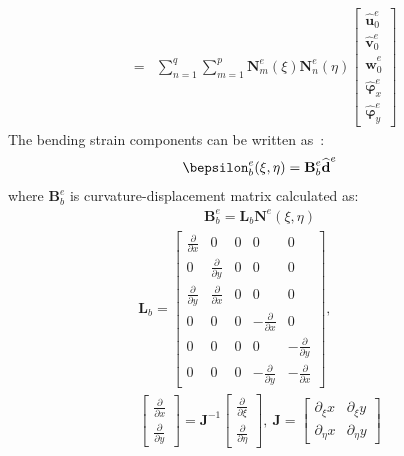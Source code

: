 \documentclass[a4paper,12pt]{article}
\begin{document}
{\begin{eqnarray}
& = & \sum_{n=1}^q\sum_{m=1}^p\textbf{N}_m^e(\xi)\textbf{N}_n^e(\eta)
\left [ \begin{array}{c}
\widehat{\textbf{u}}_0^e \\
\widehat{\textbf{v}}_0^e \\
\widehat{\textbf{w}}_0^e \\
\widehat{\boldsymbol{\varphi}}_x^e \\
\widehat{\boldsymbol{\varphi}}_y^e
\end{array} \right]
\end{eqnarray}
The bending strain components can be written as~\cite{ferreira2008matlab}:
\begin{eqnarray}
\bepsilon_b^e(\xi,\eta)=\textbf{B}_b^e\widehat{\textbf{d}}^e
\end{eqnarray}
where \(\textbf{B}_b^e\) is curvature-displacement matrix calculated as:
\begin{eqnarray}
\textbf{B}_b^e=\textbf{L}_b\textbf{N}^e(\xi,\eta)
\end{eqnarray}
\begin{eqnarray}
	\textbf{L}_b=\left [
	\begin{array}{ccccc}
		\frac{\partial }{\partial x} & 0 & 0 & 0 & 0\\
		0 & \frac{\partial }{\partial y} & 0 & 0 & 0\\
		\frac{\partial }{\partial y} & \frac{\partial }{\partial x} & 0 & 0 & 0\\
		0 & 0 & 0 & -\frac{\partial }{\partial x} & 0\\
		0 & 0 & 0 & 0 & -\frac{\partial }{\partial y}\\
		0 & 0 & 0 & -\frac{\partial }{\partial y} & -\frac{\partial }{\partial x}
	\end{array} \right],\ \\
  \left [
	\begin{array}{c}
		\frac{\partial }{\partial x}\\
		\frac{\partial }{\partial y}
	\end{array} \right] =\textbf{J}^{-1}
	\left [
	\begin{array}{c}
		\frac{\partial }{\partial \xi}\\
		\frac{\partial }{\partial \eta}
	\end{array} \right], \ 
	\textbf{J}=\left [
	\begin{array}{cc}
		\partial_\xi x & {\partial_\xi y} \\
		\partial_\eta x & {\partial_\eta y}
	\end{array} \right] \nonumber

\end{eqnarray}}
\end{document}
